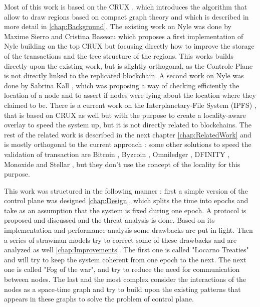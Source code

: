 \documentclass[a4paper,11pt,oneside]{report}
\begin{document}
Most of this work is based on the CRUX \cite{Basescu2014}, which introduces the
algorithm that allow to draw regions based on compact graph theory and which is
described in more detail in  \autoref{chap:Background}. The existing work on
Nyle was done by Maxime Sierro and Cristina Basescu \cite{Sierro2019} which
proposes a first implementation of Nyle building on the top CRUX
\cite{Basescu2014} but focusing directly how to improve the storage of the
transactions and the tree structure of the regions. This works builds directly
upon the existing work, but is slightly orthogonal, as the Controle Plane is
not directly linked to the replicated blockchain.  A  second work on Nyle was
done by Sabrina Kall \cite{Kall2019}, which was proposing a way of checking
efficiently the location of a node and to assert if nodes were lying about the
location where they claimed to be. There is a current work on the
Interplanetary-File System (IPFS) \cite{Michel2019}, that is based on CRUX as
well but with the purpose to create a locality-aware overlay to speed the
system up, but it is not directly related to blockchains. The rest of the
related work is described in the next chapter \autoref{chap:RelatedWork} and is
mostly orthogonal to the current approach : some other solutions to speed the
validation of transaction are Bitcoin \cite{Nakamoto2009}, Byzcoin
\cite{Kogias2016}, Omniledger \cite{Kokoris-Kogias2017},  DFINITY
\cite{Hanke2018}, Monoxide \cite{Wang2019} and Stellar \cite{Lokhava2019}, but
they don't use the concept of the locality for this purpose. 

This work was structured in the following manner : first a simple version of
the control plane was designed \autoref{chap:Design}, which splits the time into
epochs and take as an assumption that the system is fixed during one epoch. A
protocol is proposed and discussed and the threat analysis is done. Based on
its implementation and performance analysis some drawbacks are put in light.
Then a series of strawman models try to correct some of these drawbacks and are
analyzed as well \autoref{chap:Improvements}. The first one is called "Locarno
Treaties" and will try to keep the system coherent from one epoch to the next.
The next one is called "Fog of the war", and try to reduce the need for
communication between nodes. The last and the most complex consider the
interactions of the nodes as a space-time graph and try to build upon the
existing patterns that appears in these graphs to solve the problem of control
plane. 
\end{document}
